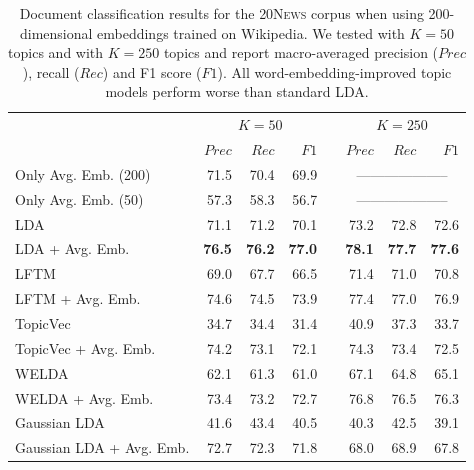 \documentclass[
        a4paper,
        titlepage,
        twoside,
        parskip,
        numbers=noenddot
        ]{scrbook}
\newcommand{\ra}[1]{\renewcommand{\arraystretch}{#1}}
\theoremstyle{break}
\begin{document}
\begin{table}[]
  \ra{1.3}
  \centering
  \caption{Document classification results for the \textsc{20News} corpus when using 200-dimensional embeddings trained on Wikipedia.
  We tested with $K = 50$ topics and with $K = 250$ topics and report macro-averaged precision ($Prec$), recall ($Rec$) and F1 score ($F1$).
  All word-embedding-improved topic models perform worse than standard LDA.}
  \label{table:document_classification_dim-200}
  \begin{tabular}{lrrrcrrr}
    \toprule
    \multirow{2}{*}{} & \multicolumn{3}{c}{$K = 50$} & \phantom{a} & \multicolumn{3}{c}{$K = 250$} \\ \cmidrule{2-4} \cmidrule{6-8}
                      & $Prec$    & $Rec$     & $F1$     && $Prec$    & $Rec$   & $F1$     \\ \midrule
                      Only Avg. Emb. (200)     & 71.5    & 70.4    & 69.9   && \multicolumn{3}{c}{--------------------}        \\
                      Only Avg. Emb. (50)      & 57.3    & 58.3    & 56.7   && \multicolumn{3}{c}{--------------------}        \\
                      LDA                      & 71.1    & 71.2    & 70.1   && 73.2    & 72.8     & 72.6   \\
                      LDA + Avg. Emb.          & \textbf{76.5}    & \textbf{76.2}    & \textbf{77.0}   && \textbf{78.1}    & \textbf{77.7}     & \textbf{77.6}   \\
                      LFTM                     & 69.0    & 67.7    & 66.5   && 71.4    & 71.0     & 70.8   \\
                      LFTM + Avg. Emb.         & 74.6    & 74.5    & 73.9   && 77.4    & 77.0     & 76.9   \\
                      TopicVec                 & 34.7    & 34.4    & 31.4   && 40.9    & 37.3     & 33.7   \\
                      TopicVec + Avg. Emb.     & 74.2    & 73.1    & 72.1   && 74.3    & 73.4     & 72.5   \\
                      WELDA                    & 62.1    & 61.3    & 61.0   && 67.1    & 64.8     & 65.1   \\
                      WELDA + Avg. Emb.        & 73.4    & 73.2    & 72.7   && 76.8    & 76.5     & 76.3   \\
                      Gaussian LDA             & 41.6    & 43.4    & 40.5   && 40.3    & 42.5     & 39.1   \\
                      Gaussian LDA + Avg. Emb. & 72.7    & 72.3    & 71.8   && 68.0    & 68.9     & 67.8   \\
  \bottomrule
  \end{tabular}
\end{table}
\end{document}
